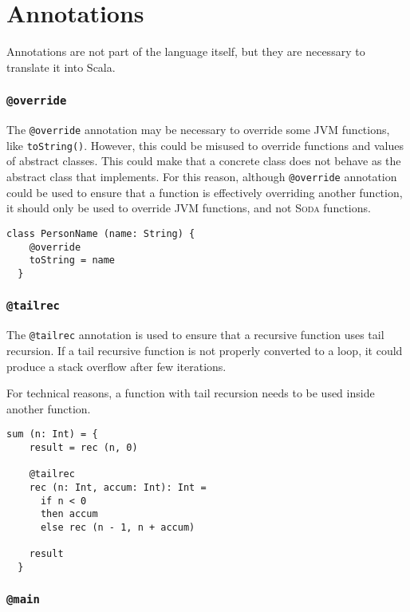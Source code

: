 \documentclass[12pt,a4paper]{book}
\makeatletter
\newcommand{\srccode}[1]{\texttt{{#1}}}
\newcommand{\annotation}[1]{{\color{brown}\srccode{#1}}\xspace}
\newcommand{\stailrec}{\annotation{@tailrec}}
\newcommand{\soverride}{\annotation{@override}}
\newcommand{\smain}{\annotation{@main}}
\newcommand{\Soda}{\textsc{Soda}\xspace}
\makeatother
\begin{document}
    \section{Annotations}

    Annotations are not part of the language itself, but they are necessary to translate it into Scala.

    \subsubsection{\soverride}

    The \soverride annotation may be necessary to override some JVM functions, like \srccode{toString()}.
    However, this could be misused to override functions and values of abstract classes.
    This could make that a concrete class does not behave as the abstract class that implements.
    For this reason, although \soverride annotation could be used to ensure that a function is effectively overriding another function, it should only be used to override JVM functions, and not \Soda functions.

    \begin{lstlisting}[label={lst:exampleOverride}]
  class PersonName (name: String) {
    @override
    toString = name
  }
    \end{lstlisting}

    \subsubsection{\stailrec}

    The \stailrec annotation is used to ensure that a recursive function uses tail recursion.
    If a tail recursive function is not properly converted to a loop, it could produce a stack overflow after few iterations.

    For technical reasons, a function with tail recursion needs to be used inside another function.

    \begin{lstlisting}[label={lst:exampleTailrecInside}]
  sum (n: Int) = {
    result = rec (n, 0)

    @tailrec
    rec (n: Int, accum: Int): Int =
      if n < 0
      then accum
      else rec (n - 1, n + accum)

    result
  }
    \end{lstlisting}

    \subsubsection{\smain}
\end{document}
